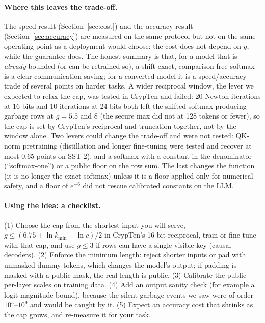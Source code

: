 \documentclass[11pt]{article}
\begin{document}
\paragraph{Where this leaves the trade-off.} The speed result (Section~\ref{sec:cost}) and the
accuracy result (Section~\ref{sec:accuracy}) are measured on the same protocol but not on the same
operating point as a deployment would choose: the cost does not depend on $g$, while the guarantee does.
The honest summary is that, for a model that is \emph{already} bounded (or can be retrained so), a
shift-exact, comparison-free softmax is a clear communication saving; for a converted model it is a speed/accuracy trade of
several points on harder tasks.
A wider reciprocal window, the lever we expected to relax the cap, was tested in CrypTen and failed: 20 Newton iterations at 16 bits and 10 iterations at 24 bits both left the shifted softmax producing garbage rows at $g=5.5$ and $8$ (the secure max did not at 128 tokens or fewer), so the cap is set by CrypTen's reciprocal and truncation together, not by the window alone. Two levers could change the trade-off and were not tested: QK-norm pretraining (distillation and longer fine-tuning were tested and recover at most 0.65 points on SST-2), and a
softmax with a constant in the denominator (``softmax-one'') or a public floor on the row sum. The last changes the function (it is no longer
the exact softmax) unless it is a floor applied only for numerical safety, and a floor of $e^{-6}$ did not rescue
calibrated constants on the LLM.

\paragraph{Using the idea: a checklist.} (1) Choose the cap from the shortest input you will serve, $g\le(6.75+\ln k_{\min}-\ln c)/2$ in CrypTen's 16-bit reciprocal, train or fine-tune with that cap, and use $g\le3$ if rows can have a single visible key (causal decoders). (2) Enforce the minimum length: reject shorter inputs or pad with unmasked dummy tokens, which changes the model's output; if padding is masked with a public mask, the real length is public. (3) Calibrate the public per-layer scales on training data. (4) Add an output sanity check (for example a logit-magnitude bound), because the silent garbage events we saw were of order $10^{5}$--$10^{9}$ and would be caught by it. (5) Expect an accuracy cost that shrinks as the cap grows, and re-measure it for your task.
\end{document}
